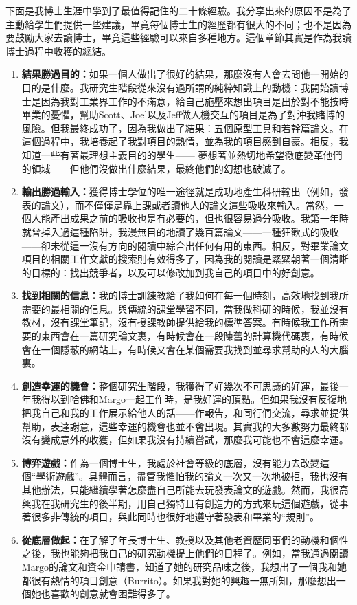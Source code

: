 \documentclass[12pt,UTF8,nofonts]{book}
\begin{document}
下面是我博士生涯中學到了最值得記住的二十條經驗。我分享出來的原因不是為了主動給學生們提供一些建議，畢竟每個博士生的經歷都有很大的不同；也不是因為要鼓勵大家去讀博士，畢竟這些經驗可以來自多種地方。這個章節其實是作為我讀博士過程中收獲的總結。
\begin{enumerate}
  \item \textbf{結果勝過目的：}如果一個人做出了很好的結果，那麼沒有人會去問他一開始的目的是什麼。我研究生階段從來沒有過所謂的純粹知識上的動機：我開始讀博士是因為我對工業界工作的不滿意，給自己施壓來想出項目是出於對不能按時畢業的憂懼，幫助Scott、Joel以及Jeff做人機交互的項目是為了對沖我賭博的風險。但我最終成功了，因為我做出了結果：五個原型工具和若幹篇論文。在這個過程中，我培養起了我對項目的熱情，並為我的項目感到自豪。相反，我知道一些有著最理想主義目的的學生—— 夢想著並熱切地希望徹底變革他們的領域——但他們沒做出什麼結果，最終他們的幻想也破滅了。
  \item \textbf{輸出勝過輸入：}獲得博士學位的唯一途徑就是成功地產生科研輸出（例如，發表的論文），而不僅僅是靠上課或者讀他人的論文這些吸收來輸入。當然，一個人能產出成果之前的吸收也是有必要的，但也很容易過分吸收。我第一年時就曾掉入過這種陷阱，我漫無目的地讀了幾百篇論文——一種狂歡式的吸收——卻未從這一沒有方向的閱讀中綜合出任何有用的東西。相反，對畢業論文項目的相關工作文獻的搜索則有效得多了，因為我的閱讀是緊緊朝著一個清晰的目標的：找出競爭者，以及可以修改加到我自己的項目中的好創意。
  \item \textbf{找到相關的信息：}我的博士訓練教給了我如何在每一個時刻，高效地找到我所需要的最相關的信息。與傳統的課堂學習不同，當我做科研的時候，我並沒有教材，沒有課堂筆記，沒有授課教師提供給我的標準答案。有時候我工作所需要的東西會在一篇研究論文裏，有時候會在一段陳舊的計算機代碼裏，有時候會在一個隱蔽的網站上，有時候又會在某個需要我找到並尋求幫助的人的大腦裏。
  \item \textbf{創造幸運的機會：}整個研究生階段，我獲得了好幾次不可思議的好運，最後一年我得以到哈佛和Margo一起工作時，是我好運的頂點。但如果我沒有反復地把我自己和我的工作展示給他人的話——作報告，和同行們交流，尋求並提供幫助，表達謝意，這些幸運的機會也並不會出現。其實我的大多數努力最終都沒有變成意外的收獲，但如果我沒有持續嘗試，那麼我可能也不會這麼幸運。
  \item \textbf{博弈遊戲：}作為一個博士生，我處於社會等級的底層，沒有能力去改變這個“學術遊戲”。具體而言，盡管我懼怕我的論文一次又一次地被拒，我也沒有其他辦法，只能繼續學著怎麼盡自己所能去玩發表論文的遊戲。然而，我很高興我在我研究生的後半期，用自己獨特且有創造力的方式來玩這個遊戲，從事著很多非傳統的項目，與此同時也很好地遵守著發表和畢業的“規則”。
  \item \textbf{從底層做起：}在了解了年長博士生、教授以及其他老資歷同事們的動機和個性之後，我也能夠把我自己的研究動機提上他們的日程了。例如，當我通過閱讀Margo的論文和資金申請書，知道了她的研究品味之後，我想出了一個我和她都很有熱情的項目創意（Burrito）。如果我對她的興趣一無所知，那麼想出一個她也喜歡的創意就會困難得多了。

\end{enumerate}
\end{document}
